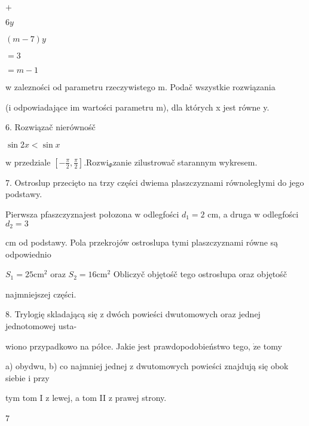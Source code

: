 \documentclass[a4paper,12pt]{article}
\begin{document}
$+$

$6y$

$(m-7)y$

$=3$

$=m-1$

w zalezności od parametru rzeczywistego m. Podač wszystkie rozwiązania

(i odpowiadające im wartości parametru m), dla których x jest równe y.

6. Rozwiązač nierównośč

$\sin 2x<\sin x$

$\mathrm{w}$ przedziale $[-\displaystyle \frac{\pi}{2},\frac{\pi}{2}]. \mathrm{R}\mathrm{o}\mathrm{z}\mathrm{w}\mathrm{i}_{\Phi}$zanie zilustrowač starannym wykresem.

7. Ostroslup przecięto na trzy części dwiema plaszczyznami równoległymi do jego podstawy.

Pierwsza pfaszczyznajest połozona $\mathrm{w}$ odlegfości $d_{1} =2$ cm, a druga $\mathrm{w}$ odlegfości $d_{2}=3$

cm od podstawy. Pola przekrojów ostroslupa tymi plaszczyznami równe są odpowiednio

$S_{1} = 25 \mathrm{c}\mathrm{m}^{2}$ oraz $S_{2} = 16 \mathrm{c}\mathrm{m}^{2}$ Obliczyč objętośč tego ostrosłupa oraz objętośč

najmniejszej części.

8. Trylogię skladającą się $\mathrm{z}$ dwóch powieści dwutomowych oraz jednej jednotomowej usta-

wiono przypadkowo na półce. Jakie jest prawdopodobieństwo tego, $\dot{\mathrm{z}}\mathrm{e}$ tomy

a) obydwu, b) co najmniej jednej $\mathrm{z}$ dwutomowych powieści znajdują się obok siebie $\mathrm{i}$ przy

tym tom I $\mathrm{z}$ lewej, a tom II $\mathrm{z}$ prawej strony.

7
\end{document}
